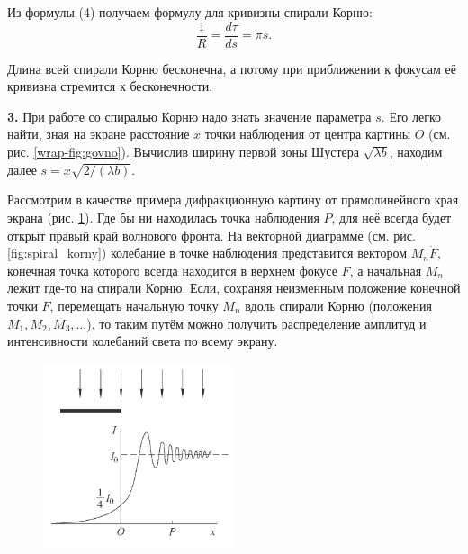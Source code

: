 \documentclass[a4paper,14pt]{article}
\begin{document}
Из формулы (4) получаем формулу для кривизны спирали Корню:
\[
\frac{1}{R} = \frac{d\tau}{ds} = \pi s.
\]

Длина всей спирали Корню бесконечна, а потому при приближении к фокусам её кривизна стремится к бесконечности.

\textbf{3.} При работе со спиралью Корню надо знать значение параметра \( s \). Его легко найти, зная на экране расстояние \( x \) точки наблюдения от центра картины \( O \) (см. рис. \ref{wrap-fig:govno}). Вычислив ширину первой зоны Шустера \( \sqrt{\lambda b} \), находим далее \( s = x\sqrt{2/(\lambda b)} \).

Рассмотрим в качестве примера дифракционную картину от прямолинейного края экрана (рис. \ref{wrap-fig:hueta}). Где бы ни находилась точка наблюдения \( P \), для неё всегда будет открыт правый край волнового фронта. На векторной диаграмме (см. рис. \ref{fig:spiral_korny}) колебание в точке наблюдения представится вектором \( M_n \dot{F} \), конечная точка которого всегда находится в верхнем фокусе \( F \), а начальная \( M_n \) лежит где-то на спирали Корню. Если, сохраняя неизменным положение конечной точки \( F \), перемещать начальную точку \( M_n \) вдоль спирали Корню (положения \( M_1, M_2, M_3, \ldots \)), то таким путём можно получить распределение амплитуд и интенсивности колебаний света по всему экрану.

\begin{figure}
    \includegraphics[width = 0.5\textwidth]{hueta.png}
    \caption{}\label{wrap-fig:hueta}
\end{figure}
\end{document}
